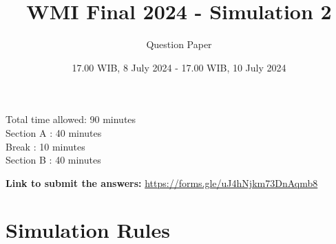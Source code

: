 \documentclass[12pt]{scrartcl}
\title{WMI Final 2024 - Simulation 2}
\author{Question Paper}
\date{17.00 WIB, 8 July 2024 - 17.00 WIB, 10 July 2024}
\begin{document}
\maketitle
\begin{center}
    \Huge
\end{center}
\vspace{3cm}

\begin{flushleft}
\LARGE
   Total time allowed: 90 minutes\\
\large
   Section A : 40 minutes\\
   Break : 10 minutes\\
   Section B : 40 minutes
\end{flushleft}

\vspace{2cm}
\begin{flushleft}
    \Large
    \textbf{Link to submit the answers:} \url{https://forms.gle/uJ4hNjkm73DnAqmb8}
\end{flushleft}

\newpage
\section*{Simulation Rules}
\end{document}
